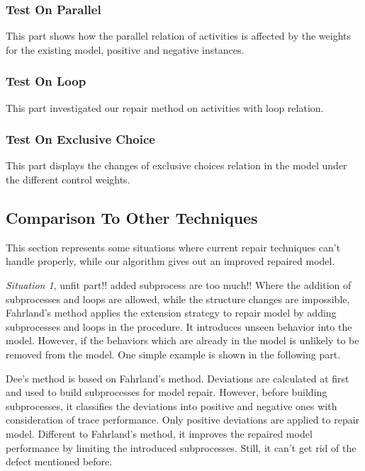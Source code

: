 \subsubsection{Test On Parallel}
This part shows how the parallel relation of activities is affected by the weights for the existing model, positive and negative instances.

\subsubsection{Test On Loop}
This part investigated our repair method on activities with loop relation.

\subsubsection{Test On Exclusive Choice}
This part displays the changes of exclusive choices relation in the model under the different control weights.

\subsection{Comparison To Other Techniques}
This section represents some situations where current repair techniques can't handle properly, while our algorithm gives out an improved repaired model. 

\emph{Situation 1}, unfit part!! added subprocess are too much!! Where the addition of subprocesses and loops are allowed, while the structure changes are impossible, 
Fahrland's method applies the extension strategy to repair model by adding subprocesses and loops in the procedure. It introduces unseen behavior into the model. However, if the behaviors which are already in the model is unlikely to be removed from the model. One simple example is shown in the following part. 

Dee's method is based on Fahrland's method. Deviations are calculated at first and used to build subprocesses for model repair. However, before building subprocesses, it classifies the deviations into positive and negative ones with consideration of trace performance. Only positive deviations are applied to repair model. Different to Fahrland's method, it improves the repaired model performance by limiting the introduced subprocesses. Still, it can't get rid of the defect mentioned before. 

